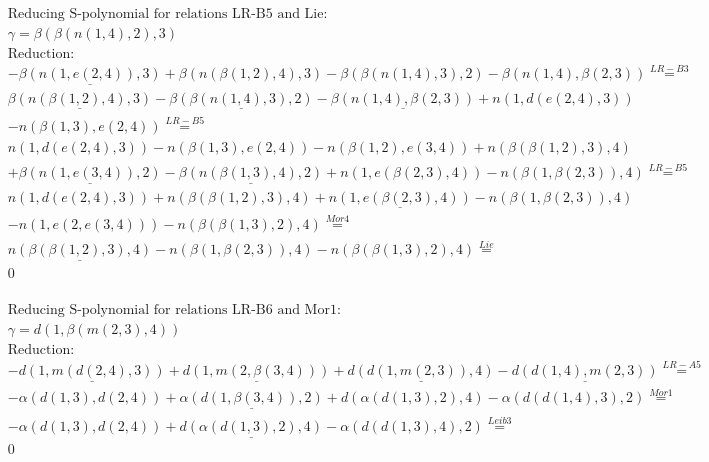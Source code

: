 \documentclass[11pt]{amsart}
\begin{document}
\begin{align*} 
& \text{Reducing S-polynomial for relations LR-B5 and Lie:} \\ 
& \gamma = \beta(\beta(n(1,4),2),3) \\ 
& \text{Reduction}: \\& - \underline{\beta(n(1,e(2,4)),3)} + \beta(n(\beta(1,2),4),3) - \beta(\beta(n(1,4),3),2) - \beta(n(1,4),\beta(2,3)) \stackrel{ LR-B3 }{=}  \\ 
&\underline{\beta(n(\beta(1,2),4),3)} - \underline{\beta(\beta(n(1,4),3),2)} - \underline{\beta(n(1,4),\beta(2,3))} + n(1,d(e(2,4),3))\\ 
 &  - n(\beta(1,3),e(2,4)) \stackrel{ LR-B5 }{=}  \\ 
&n(1,d(e(2,4),3)) - n(\beta(1,3),e(2,4)) - n(\beta(1,2),e(3,4)) + n(\beta(\beta(1,2),3),4)\\ 
 &  + \underline{\beta(n(1,e(3,4)),2)} - \underline{\beta(n(\beta(1,3),4),2)} + n(1,e(\beta(2,3),4)) - n(\beta(1,\beta(2,3)),4) \stackrel{ LR-B5 }{=}  \\ 
&n(1,d(e(2,4),3)) + n(\beta(\beta(1,2),3),4) + \underline{n(1,e(\beta(2,3),4))} - n(\beta(1,\beta(2,3)),4)\\ 
 &  - n(1,e(2,e(3,4))) - n(\beta(\beta(1,3),2),4) \stackrel{ Mor4 }{=}  \\ 
&\underline{n(\beta(\beta(1,2),3),4)} - n(\beta(1,\beta(2,3)),4) - n(\beta(\beta(1,3),2),4) \stackrel{ Lie }{=}  \\ 
&0\\ 
\end{align*} 
 
\begin{align*} 
& \text{Reducing S-polynomial for relations LR-B6 and Mor1:} \\ 
& \gamma = d(1,\beta(m(2,3),4)) \\ 
& \text{Reduction}: \\& - \underline{d(1,m(d(2,4),3))} + \underline{d(1,m(2,\beta(3,4)))} + \underline{d(d(1,m(2,3)),4)} - \underline{d(d(1,4),m(2,3))} \stackrel{ LR-A5 }{=}  \\ 
& - \alpha(d(1,3),d(2,4)) + \underline{\alpha(d(1,\beta(3,4)),2)} + d(\alpha(d(1,3),2),4) - \alpha(d(d(1,4),3),2) \stackrel{ Mor1 }{=}  \\ 
& - \alpha(d(1,3),d(2,4)) + \underline{d(\alpha(d(1,3),2),4)} - \alpha(d(d(1,3),4),2) \stackrel{ Leib3 }{=}  \\ 
&0\\ 
\end{align*} 
 
\end{document}

